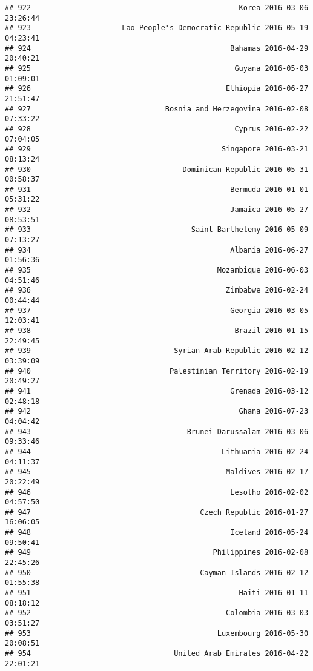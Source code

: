 \documentclass[
]{article}
\begin{document}
\begin{verbatim}
## 922                                                Korea 2016-03-06 23:26:44
## 923                     Lao People's Democratic Republic 2016-05-19 04:23:41
## 924                                              Bahamas 2016-04-29 20:40:21
## 925                                               Guyana 2016-05-03 01:09:01
## 926                                             Ethiopia 2016-06-27 21:51:47
## 927                               Bosnia and Herzegovina 2016-02-08 07:33:22
## 928                                               Cyprus 2016-02-22 07:04:05
## 929                                            Singapore 2016-03-21 08:13:24
## 930                                   Dominican Republic 2016-05-31 00:58:37
## 931                                              Bermuda 2016-01-01 05:31:22
## 932                                              Jamaica 2016-05-27 08:53:51
## 933                                     Saint Barthelemy 2016-05-09 07:13:27
## 934                                              Albania 2016-06-27 01:56:36
## 935                                           Mozambique 2016-06-03 04:51:46
## 936                                             Zimbabwe 2016-02-24 00:44:44
## 937                                              Georgia 2016-03-05 12:03:41
## 938                                               Brazil 2016-01-15 22:49:45
## 939                                 Syrian Arab Republic 2016-02-12 03:39:09
## 940                                Palestinian Territory 2016-02-19 20:49:27
## 941                                              Grenada 2016-03-12 02:48:18
## 942                                                Ghana 2016-07-23 04:04:42
## 943                                    Brunei Darussalam 2016-03-06 09:33:46
## 944                                            Lithuania 2016-02-24 04:11:37
## 945                                             Maldives 2016-02-17 20:22:49
## 946                                              Lesotho 2016-02-02 04:57:50
## 947                                       Czech Republic 2016-01-27 16:06:05
## 948                                              Iceland 2016-05-24 09:50:41
## 949                                          Philippines 2016-02-08 22:45:26
## 950                                       Cayman Islands 2016-02-12 01:55:38
## 951                                                Haiti 2016-01-11 08:18:12
## 952                                             Colombia 2016-03-03 03:51:27
## 953                                           Luxembourg 2016-05-30 20:08:51
## 954                                 United Arab Emirates 2016-04-22 22:01:21

\end{verbatim}
\end{document}
